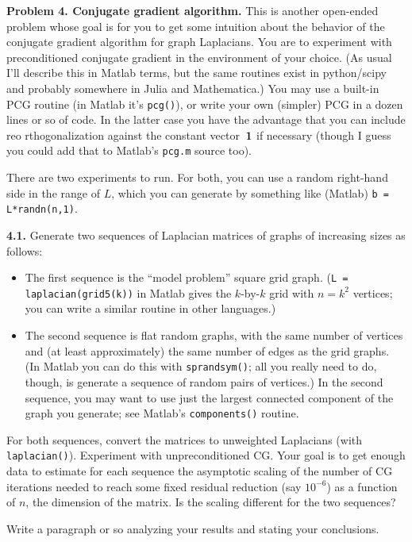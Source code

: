 \documentclass[11pt]{article}
\newcommand{\m}[1]{{\bf{#1}}}       %
\newcommand{\ones}{\m1}             %
\begin{document}
\par\bigskip
{\bf Problem 4. Conjugate gradient algorithm.}
This is another open-ended problem whose goal is for you to get some
intuition about the behavior of the conjugate gradient algorithm for graph 
Laplacians.
You are to experiment with preconditioned conjugate gradient
in the environment of your choice.
(As usual I'll describe this in Matlab terms, but the same routines
exist in python/scipy and probably somewhere in Julia and Mathematica.)
You may use a built-in PCG routine (in Matlab it's {\tt pcg()}),
or write your own (simpler) PCG in a dozen lines or so of code.
In the latter case you have the advantage that you can include reo
rthogonalization against the constant vector~$\ones$ if necessary 
(though I guess you could add that to Matlab's {\tt pcg.m} source too).

There are two experiments to run. 
For both, you can use a random right-hand side in the range of $L$,
which you can generate by something like (Matlab) {\tt b = L*randn(n,1)}.

\par\medskip
{\bf 4.1.}
Generate two sequences of Laplacian matrices of graphs of increasing sizes as
follows:  
\begin{itemize}
\item
The first sequence is the ``model problem'' square grid graph.
({\tt L = laplacian(grid5(k))} in Matlab
gives the $k$-by-$k$ grid with $n=k^2$ vertices;
you can write a similar routine in other languages.)
\item
The second sequence is flat random graphs, with the same number of vertices
and (at least approximately) the same number of edges as the grid graphs.
(In Matlab you can do this with {\tt sprandsym()};
all you really need to do, though, is generate a sequence of random
pairs of vertices.)
In the second sequence, you may want to use just the largest connected 
component of the graph you generate; see Matlab's {\tt components()} routine.
\end{itemize}
For both sequences, convert the matrices to unweighted Laplacians 
(with {\tt laplacian()}).
Experiment with unpreconditioned CG.
Your goal is to get enough data to estimate for each sequence the 
asymptotic scaling of the number of CG iterations needed to reach 
some fixed residual reduction (say $10^{-6}$) as a function of $n$, 
the dimension of the matrix.  
Is the scaling different for the two sequences?
\par
Write a paragraph or so analyzing your results and stating your conclusions.
\end{document}
